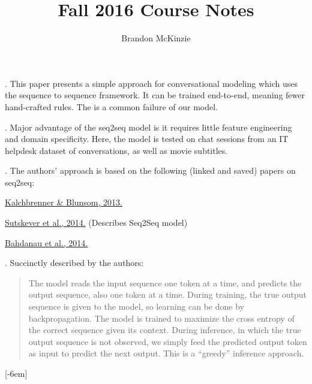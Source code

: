 \documentclass[11pt]{article}
\title{\vspace{-10mm}\fontsize{24pt}{8pt}\selectfont\textbf{Fall 2016 Course Notes}\vspace*{-4mm}}
\author{Brandon McKinzie}
\date{}
\begin{document}
\dosecttoc
\tableofcontents

\label{Neural Machine Translation}


\vspace{-1em}

\p {}. This paper presents a simple approach for conversational modeling which uses the sequence to sequence framework. It can be trained end-to-end, meaning fewer hand-crafted rules. The  is a common failure of our model. 

\myspace
\p {}. Major advantage of the seq2seq model is it requires little feature engineering and domain specificity. Here, the model is tested on chat sessions from an IT helpdesk dataset of conversations, as well as movie subtitles.

\myspace
\p {}. The authors' approach is based on the following (linked and saved) papers on seq2seq:
\begin{compactitem}
	\item \href{https://arxiv.org/pdf/1306.3584.pdf}{Kalchbrenner \& Blunsom, 2013.}
	\item \href{https://arxiv.org/pdf/1409.3215.pdf}{Sutskever et al., 2014.} (Describes Seq2Seq model)
	\item \href{https://arxiv.org/pdf/1409.0473.pdf}{Bahdanau et al., 2014.}
\end{compactitem}

\myspace
\p {}. Succinctly described by the authors:\vspace{-1em}
\begin{quote}
	The model reads the input sequence one token at a time, and predicts the output sequence, also one token at a time. During training, the true output sequence is given to the model, so learning can be done by backpropagation. The model is trained to maximize the cross entropy of the correct sequence given
	its context. During inference, in which the true output sequence is not observed, we simply feed the predicted output token as input to predict the next output. This is a “greedy” inference approach. 
\end{quote}
[-6em]
\end{document}
